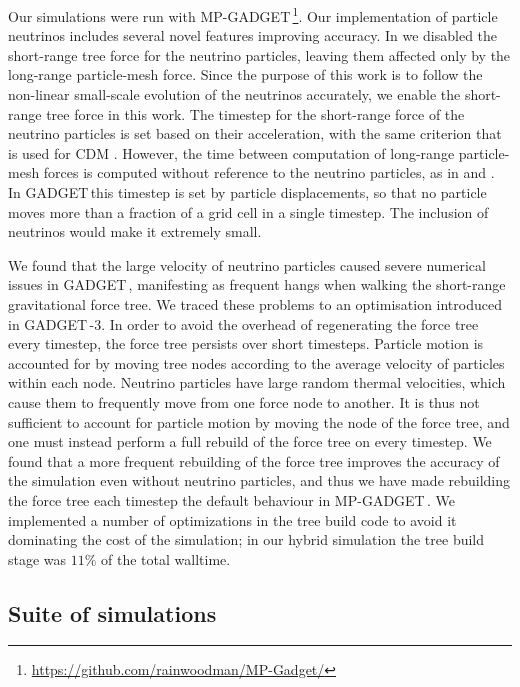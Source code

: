 \documentclass[useAMS, usenatbib]{mnras}
\newcommand{\gadget}{{\small GADGET\,}}
\begin{document}
Our simulations were run with MP-\gadget\footnote{\url{https://github.com/rainwoodman/MP-Gadget/}}. Our implementation of particle neutrinos includes several novel features improving accuracy.
In \cite{Bird_2012} we disabled the short-range tree force for the neutrino particles, leaving them affected only by the long-range particle-mesh force. Since the purpose of this work is to follow the non-linear small-scale evolution of the neutrinos accurately, we enable the short-range tree force in this work. The timestep for the short-range force of the neutrino particles is set based on their acceleration, with the same criterion that is used for CDM \citep{Springel_2005}. However, the time between computation of long-range particle-mesh forces is computed without reference to the neutrino particles, as in \cite{Viel_2010} and \cite{Bird_2012}. In \gadget this timestep is set by particle displacements, so that no particle moves more than a fraction of a grid cell in a single timestep. The inclusion of neutrinos would make it extremely small.

We found that the large velocity of neutrino particles caused severe numerical issues in \gadget, manifesting as frequent hangs when walking the short-range gravitational force tree. We traced these problems to an optimisation introduced in \gadget-3. In order to avoid the overhead of regenerating the force tree every timestep, the force tree persists over short timesteps. Particle motion is accounted for by moving tree nodes according to the average velocity of particles within each node. Neutrino particles have large random thermal velocities, which cause them to frequently move from one force node to another. It is thus not sufficient to account for particle motion by moving the node of the force tree, and one must instead perform a full rebuild of the force tree on every timestep. We found that a more frequent rebuilding of the force tree improves the accuracy of the simulation even without neutrino particles, and thus we have made rebuilding the force tree each timestep the default behaviour in MP-\gadget. We implemented a number of optimizations in the tree build code to avoid it dominating the cost of the simulation; in our hybrid simulation the tree build stage was $11\%$ of the total walltime.

\subsection{Suite of simulations}
\end{document}
